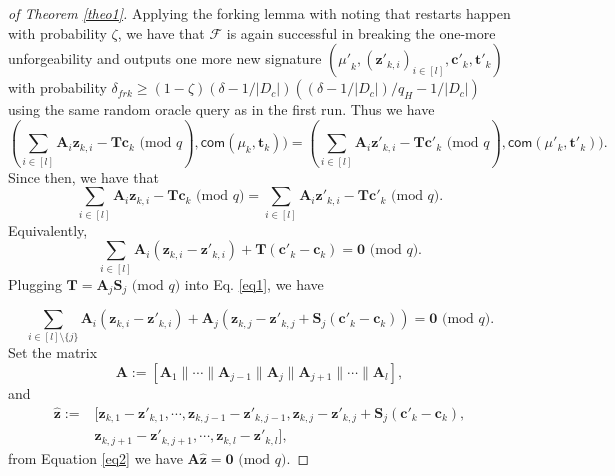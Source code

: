 \documentclass[runningheads]{llncs}
\begin{document}
\begin{proof}[of Theorem \ref{theo1}]
	Applying the forking lemma \cite[Lemma 3.1]{BN06} with noting that restarts happen with probability $\zeta$, we have that $\mathcal{F}$ is again successful in breaking the one-more unforgeability and outputs one more new signature $({\mu'}_k, (\mathbf{z}'_{k,i})_{i \in [l]}, \mathbf{c}'_k, \mathbf{t}'_k)$ with probability $\delta_{frk} \geq (1-\zeta) (\delta-1/|D_c|)((\delta-1/|D_c|)/q_H-1/|D_c|)$ using the same random oracle query as in the first run. Thus we have 
	$$(\sum_{i \in [l]}\mathbf{A}_i\mathbf{z}_{k,i} -\mathbf{T}\mathbf{c}_k\text{ (mod } q), \mathsf{com}(\mu_k,\mathbf{t}_k))=(\sum_{i \in [l]}\mathbf{A}_i\mathbf{z}'_{k,i} -\mathbf{T}\mathbf{c}'_k\text{ (mod } q), \mathsf{com}(\mu'_k,\mathbf{t}'_k)).$$
	Since then, we have that
	$$\sum_{i \in [l]}\mathbf{A}_i\mathbf{z}_{k,i} -\mathbf{T}\mathbf{c}_k\text{ (mod } q)=\sum_{i \in [l]}\mathbf{A}_i\mathbf{z}'_{k,i} -\mathbf{T}\mathbf{c}'_k\text{ (mod } q).$$
	Equivalently, 
	\begin{equation}\label{eq1}
	\sum_{i \in [l]}\mathbf{A}_i(\mathbf{z}_{k,i}-\mathbf{z}'_{k,i}) +\mathbf{T}(\mathbf{c}'_k-\mathbf{c}_k)=\textbf{0} \text{ (mod } q).
	\end{equation}
	Plugging  $\mathbf{T} =\mathbf{A}_{j}\mathbf{S}_{j} \text{ (mod } q)$ into Eq. \eqref{eq1}, we have
	
	\begin{equation}\label{eq2}
	\sum_{i \in [l]\setminus \{j\}}\mathbf{A}_i(\mathbf{z}_{k,i}-\mathbf{z}'_{k,i}) +\mathbf{A}_{j}(\mathbf{z}_{k,j}-\mathbf{z}'_{k,j}+\mathbf{S}_{j}(\mathbf{c}'_k-\mathbf{c}_k))=\textbf{0} \text{ (mod } q).
	\end{equation}
	Set the matrix 
	$$
	\mathbf{A}:=[\mathbf{A}_1\|\cdots\|\mathbf{A}_{{j}-1}\|\mathbf{A}_{j}\|\mathbf{A}_{{j}+1}\|\cdots\|\mathbf{A}_l],$$ and
	\begin{align*}
	\widehat{\mathbf{z}}:=&[\mathbf{z}_{k,1}-\mathbf{z}'_{k,1},\cdots,\mathbf{z}_{k,{{j}-1}}-\mathbf{z}'_{k,{{j}-1}},\mathbf{z}_{k,j}-\mathbf{z}'_{k,j}+\mathbf{S}_{j}(\mathbf{c}'_k-\mathbf{c}_k),\\&\mathbf{z}_{k,{{j}+1}}-\mathbf{z}'_{k,{{j}+1}},\cdots,\mathbf{z}_{k,l}-\mathbf{z}'_{k,l}],
	\end{align*}
	from Equation \eqref{eq2} we have $\mathbf{A}\widehat{\mathbf{z}}=\mathbf{0} \text{ (mod } q)$.
	

\end{proof}
\end{document}
